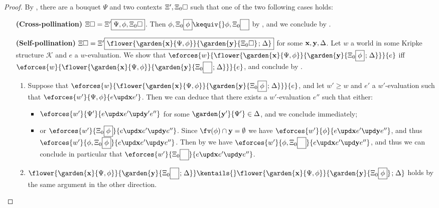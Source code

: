 \begin{proof}
  By , there are a bouquet $\Psi$ and two contexts $\Xi',
  \Xi_0\square$ such that one of the two following cases holds:
  \begin{itemize}
    \item[\textbf{(Cross-pollination)}] $\Xi\square = \Xi'\fbox{$\Psi, \phi,
    \Xi_0\square$}$. Then $\phi, \Xi_0\select{\phi} \kequiv{} \phi,
    \Xi_0\select{\phantom\phi}$ by , and we
    conclude by .
    \item[\textbf{(Self-pollination)}] $\Xi\hole =
    \Xi'\select{\flower{\garden{\bx}{\Psi,
    \phi}}{\garden{\by}{\Xi_0\hole} \sep \Delta}}$ for some
    $\mathbf{x},\mathbf{y},\Delta$. Let $w$ a world in some Kripke
    structure $\mathcal{K}$ and $e$ a $w$-evaluation. We show that
    $\eforces{w}{\flower{\garden{\bx}{\Psi,
    \phi}}{\garden{\by}{\Xi_0\select{\phi} \sep \Delta}}}{e}$ iff
    $\eforces{w}{\flower{\garden{\bx}{\Psi,
    \phi}}{\garden{\by}{\Xi_0\select{\phantom{\phi}} \sep \Delta}}}{e}$,
    and conclude by .
    \begin{enumerate}
      \item Suppose that $\eforces{w}{\flower{\garden{\bx}{\Psi,
      \phi}}{\garden{\by}{\Xi_0\select{\phi} \sep \Delta}}}{e}$, and let
      $w' \geq w$ and $e'$ a $w'$-evaluation such that $\eforces{w'}{\Psi,
      \phi}{\update{e}{\bx}{e'}}$. Then we can deduce that there exists a
      $w'$-evaluation $e''$ such that either:
      \begin{itemize}
        \item
        $\eforces{w'}{\Psi'}{\update{e}{\bx}{\update{e'}{\mathbf{y'}}{e''}}}$
        for some $\garden{\mathbf{y'}}{\Psi'} \in \Delta$, and we conclude
        immediately;
        \item
        or
        $\eforces{w'}{\Xi_0\select{\phi}}{\update{e}{\bx}{\update{e'}{\by}{e''}}}$.
        Since $\fv(\phi) \cap \by = \emptyset$ we have
        $\eforces{w'}{\phi}{\update{e}{\bx}{\update{e'}{\by}{e''}}}$,
        and thus $\eforces{w'}{\phi,
        \Xi_0\select{\phi}}{\update{e}{\bx}{\update{e'}{\by}{e''}}}$.
        Then by  we have $\eforces{w'}{\phi,
        \Xi_0\select{\phantom{\phi}}}{\update{e}{\bx}{\update{e'}{\by}{e''}}}$,
        and thus we can conclude in particular that
        $\eforces{w'}{\Xi_0\select{\phantom{\phi}}}{\update{e}{\bx}{\update{e'}{\by}{e''}}}$.
      \end{itemize}
    \item $\flower{\garden{\bx}{\Psi,
    \phi}}{\garden{\by}{\Xi_0\select{\phantom{\phi}} \sep \Delta}}
    \kentails{}\flower{\garden{\bx}{\Psi,
    \phi}}{\garden{\by}{\Xi_0\select{\phi}} \sep \Delta}$ holds by the same
    argument in the other direction.
    \end{enumerate}
  \end{itemize}
\end{proof}

